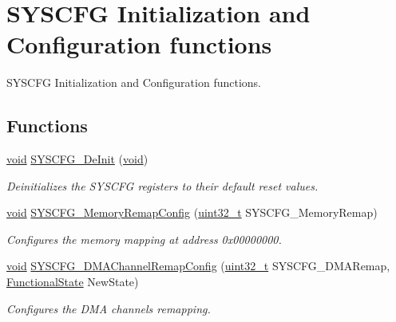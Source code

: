 \hypertarget{group___s_y_s_c_f_g___group1}{\section{S\-Y\-S\-C\-F\-G Initialization and Configuration functions}
\label{group___s_y_s_c_f_g___group1}
}


S\-Y\-S\-C\-F\-G Initialization and Configuration functions.  


\subsection*{Functions}
\begin{DoxyCompactItemize}
\item 
\hyperlink{group___n_a_m_e_ga18028b8badbf1ea7e704ccac3c488e82}{void} \hyperlink{group___s_y_s_c_f_g___group1_gaf2f9faa2df9a59a68ae17fae23bc478e}{S\-Y\-S\-C\-F\-G\-\_\-\-De\-Init} (\hyperlink{group___n_a_m_e_ga18028b8badbf1ea7e704ccac3c488e82}{void})
\begin{DoxyCompactList}\small\item\em Deinitializes the S\-Y\-S\-C\-F\-G registers to their default reset values. \end{DoxyCompactList}\item 
\hyperlink{group___n_a_m_e_ga18028b8badbf1ea7e704ccac3c488e82}{void} \hyperlink{group___s_y_s_c_f_g___group1_ga5a8c4f51c769ecf36f5c2b407663fcb4}{S\-Y\-S\-C\-F\-G\-\_\-\-Memory\-Remap\-Config} (\hyperlink{stdint_8h_a435d1572bf3f880d55459d9805097f62}{uint32\-\_\-t} S\-Y\-S\-C\-F\-G\-\_\-\-Memory\-Remap)
\begin{DoxyCompactList}\small\item\em Configures the memory mapping at address 0x00000000. \end{DoxyCompactList}\item 
\hyperlink{group___n_a_m_e_ga18028b8badbf1ea7e704ccac3c488e82}{void} \hyperlink{group___s_y_s_c_f_g___group1_gaece9c7d3083c22182a7b6137360b23ac}{S\-Y\-S\-C\-F\-G\-\_\-\-D\-M\-A\-Channel\-Remap\-Config} (\hyperlink{stdint_8h_a435d1572bf3f880d55459d9805097f62}{uint32\-\_\-t} S\-Y\-S\-C\-F\-G\-\_\-\-D\-M\-A\-Remap, \hyperlink{group___exported__types_gac9a7e9a35d2513ec15c3b537aaa4fba1}{Functional\-State} New\-State)
\begin{DoxyCompactList}\small\item\em Configures the D\-M\-A channels remapping. \end{DoxyCompactList}\item 

\end{DoxyCompactItemize}
